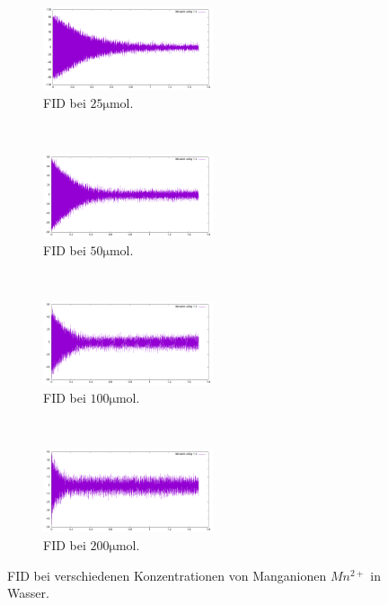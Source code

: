 \documentclass{subfiles}
\begin{document}
            \begin{figure}
                \centering
                \begin{subfigure}[b]{0.4\textwidth}
                    \centering
                    \includegraphics[width=5cm]{Live-Dokumente/Bilder/FID-11/FID_25.png}
                    \caption{FID bei $25\si{\micro\mol}$.}
                \end{subfigure}
                \
                \begin{subfigure}[b]{0.4\textwidth}
                    \centering
                    \includegraphics[width=5cm]{Live-Dokumente/Bilder/FID-11/FID_50.png}
                    \caption{FID bei $50\si{\micro\mol}$.}
                \end{subfigure}
                \
                \begin{subfigure}[b]{0.4\textwidth}
                    \centering
                    \includegraphics[width=5cm]{Live-Dokumente/Bilder/FID-11/FID_100.png}
                    \caption{FID bei $100\si{\micro\mol}$.}
                \end{subfigure}
                \
                \begin{subfigure}[b]{0.4\textwidth}
                    \centering
                    \includegraphics[width=5cm]{Live-Dokumente/Bilder/FID-11/FID_200.png}
                    \caption{FID bei $200\si{\micro\mol}$.}
                \end{subfigure}
                \caption{FID bei verschiedenen Konzentrationen von Manganionen $Mn^{2+}$ in Wasser.}
            \end{figure}
\end{document}
